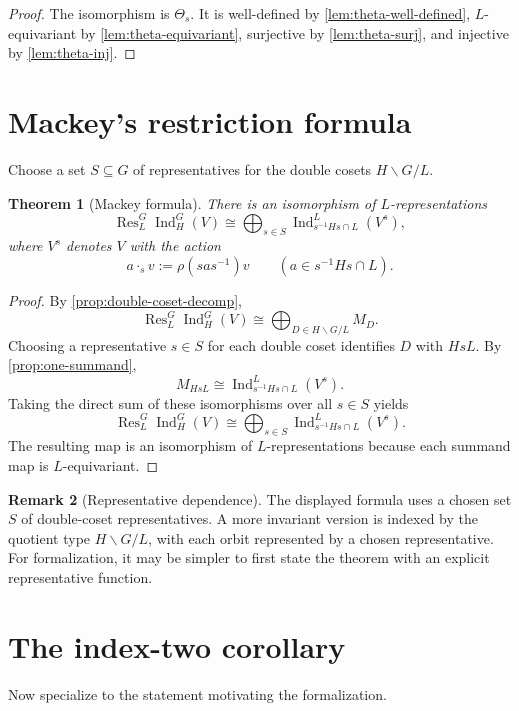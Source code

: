 \documentclass[11pt]{article}
\newtheorem{theorem}{Theorem}[section]
\theoremstyle{definition}
\newtheorem{remark}[theorem]{Remark}
\newcommand{\Ind}{\operatorname{Ind}}
\newcommand{\Res}{\operatorname{Res}}
\begin{document}
\begin{proof}
The isomorphism is $\Theta_s$. It is well-defined by \cref{lem:theta-well-defined}, $L$-equivariant by \cref{lem:theta-equivariant}, surjective by \cref{lem:theta-surj}, and injective by \cref{lem:theta-inj}.
\end{proof}

\section{Mackey's restriction formula}

Choose a set $S\subseteq G$ of representatives for the double cosets $H\backslash G/L$.

\begin{theorem}[Mackey formula]\label{thm:mackey}
There is an isomorphism of $L$-representations
\[
  \Res^G_L\Ind_H^G(V)
  \cong
  \bigoplus_{s\in S}
  \Ind_{s^{-1}Hs\cap L}^{L}(V^s),
\]
where $V^s$ denotes $V$ with the action
\[
  a\cdot_s v := \rho(sas^{-1})v
  \qquad (a\in s^{-1}Hs\cap L).
\]
\end{theorem}

\begin{proof}
By \cref{prop:double-coset-decomp},
\[
  \Res^G_L\Ind_H^G(V)
  \cong
  \bigoplus_{D\in H\backslash G/L}M_D.
\]
Choosing a representative $s\in S$ for each double coset identifies $D$ with $HsL$. By \cref{prop:one-summand},
\[
  M_{HsL}
  \cong
  \Ind_{s^{-1}Hs\cap L}^{L}(V^s).
\]
Taking the direct sum of these isomorphisms over all $s\in S$ yields
\[
  \Res^G_L\Ind_H^G(V)
  \cong
  \bigoplus_{s\in S}
  \Ind_{s^{-1}Hs\cap L}^{L}(V^s).
\]
The resulting map is an isomorphism of $L$-representations because each summand map is $L$-equivariant.
\end{proof}

\begin{remark}[Representative dependence]
The displayed formula uses a chosen set $S$ of double-coset representatives. A more invariant version is indexed by the quotient type $H\backslash G/L$, with each orbit represented by a chosen representative. For formalization, it may be simpler to first state the theorem with an explicit representative function.
\end{remark}

\section{The index-two corollary}

Now specialize to the statement motivating the formalization.
\end{document}
